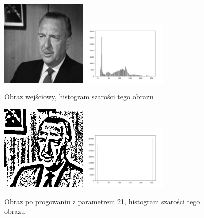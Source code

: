 \documentclass[final,a4paper,openany,12pt]{mwbk}
\begin{document}
\begin{figure}[H]
	\begin{center}
		\includegraphics[width=0.37\textwidth]{gentelman_gray}
		\includegraphics[width=0.37\textwidth]{gentelman_gray_histogram}
	\end{center}
	\caption{Obraz wejściowy, histogram szarości tego obrazu}
\end{figure}

\begin{figure}[H]
	\begin{center}
		\includegraphics[width=0.37\textwidth]{gentelman_gray_locThreshold_result}
		\includegraphics[width=0.37\textwidth]{gentelman_gray_locThreshold_histogram}
	\end{center}
	\caption{Obraz po progowaniu z parametrem 21, histogram szarości tego obrazu}
\end{figure}
\end{document}
